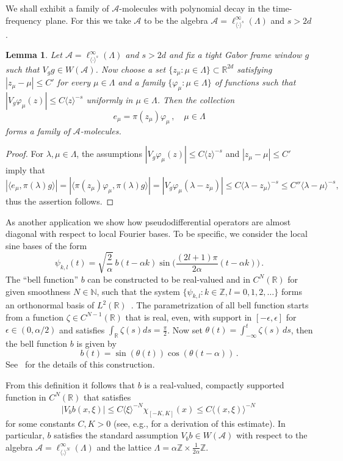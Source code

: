 \documentclass[12pt]{amsart}
\newtheorem{lemma}{Lemma}[section]
\theoremstyle{definition}
\theoremstyle{remark}
\numberwithin{equation}{section}
\newcommand{\tf}{time-frequency}
\newcommand{\psdo}{pseudodifferential operator}
\def\cA{\mathcal{A}}
\def\bR{{\mathbb{R}}}
\def\bN{{\mathbb{N}}}
\def\rdd{{\bR^{2d}}}
\def\cA{\mathcal{A}}
\newcommand{\br}{\mathbb{R}}
\newcommand{\bz}{\mathbb{Z}}
\newcommand{\Cal}{\mathcal}
\newcommand{\la}{\lambda}
\newcommand{\La}{\Lambda}
\newcommand{\lan}{\langle}
\newcommand{\ran}{\rangle}
\newcommand{\ac}{\Cal A}
\begin{document}
We shall exhibit a family of $\ac$-molecules with polynomial decay in
the \tf\ plane. For this we take $\cA $ to be  the algebra
$\ac=\ell^\infty_{\lan \cdot\ran^s}(\Lambda)$   and $s>2d$.

\begin{lemma}\label{mole8}
Let $\ac=\ell^\infty_{\lan \cdot\ran^s}(\Lambda)$ and $s>2d$ and 
fix a tight Gabor frame window $g$ such that $V_gg\in W(\ac)$.
Now choose a set
$\{z_\mu:\mu\in\La\}\subset \rdd$ satisfying  $|z_\mu-\mu|\le C'$
for every $\mu\in\La$ and  a family $\{\varphi_{\mu}:\mu\in\La\}$ of
functions such that $|V_g\varphi_\mu(z)|\le C\lan z\ran^{-s}$ uniformly
in 
$\mu\in\La$.   Then the  collection
\[
e_{\mu}=\pi(z_\mu)\varphi_{\mu}\,,\quad \mu\in\La
\]
forms a family of $\ac$-molecules. 
\end{lemma}
\begin{proof}
For $\la,\mu\in\La$, the assumptions $|V_g\varphi_\mu(z)|\le C\lan
z\ran^{-s}$ and $|z_\mu-\mu|\le C'$ imply that
\[
|\lan
e_\mu,\pi(\la)g\ran|=|\lan\pi(z_\mu)\varphi_{\mu},\pi(\la)g\ran|=
|V_g\varphi_\mu(\la-z_\mu)| \le C\lan \la-z_\mu\ran^{-s}\le
C''\lan \la-\mu\ran^{-s},
\]
thus the assertion follows.
\end{proof}



As another application we show how \psdo s are almost diagonal with
respect to  local Fourier bases. To be specific, we consider the local
sine bases of the form
\[
\psi_{k,l}(t)=\sqrt{\frac 2 \alpha}\, b(t-\alpha k)
\sin\Big(\frac{(2l+1)\pi}{2\alpha}(t-\alpha k)\Big) \, .
\]
The ``bell function'' $b$ can be constructed to be real-valued and in
$C^N(\bR )$ for given smoothness $N\in \bN $, such that
the system $\{\psi_{k,l}:k\in\bz,
l=0,1,2,\dots\}$ forms an orthonormal basis of
$L^2(\br)$~\cite{auscher94,hernandez-weiss}. The
parametrization of all bell function starts from   a
function $\zeta \in C^{N-1}(\bR)$ that  is real,   even, with support in
$[-\epsilon,\epsilon]$ for  $\epsilon \in (0,\alpha/2)$ and satisfies $\int_\br
\zeta(s)ds=\frac\pi2$. Now set $ \theta(t)=\int_{-\infty}^t \zeta (s)\,ds$, then
the bell function $b$ is given by \[
b(t)=\sin(\theta(t))\cos(\theta(t-\alpha))\, .
\]
See~\cite{auscher94,hernandez-weiss} for the details of this construction. 


 From this definition it follows that $b$ is a real-valued,  compactly supported
function in $C^N(\bR)$ that satisfies
$$
|V_bb(x,\xi )| \leq C \langle \xi \rangle ^{-N} \chi _{[-K,K]}(x) \leq
C \langle (x,\xi )\rangle ^{-N} \,
$$
for some constants $C,K>0$ (see, e.g., \cite{GS00} for a derivation of
this estimate). In particular, $b$ satisfies the standard assumption
$V_bb \in W(\ac)$ with respect to the
algebra $\cA = \ell ^\infty _{\langle   .\rangle ^N}(\La)$ and the lattice $\La=\alpha\bz\times\frac1{2\alpha}\bz$.
\end{document}
